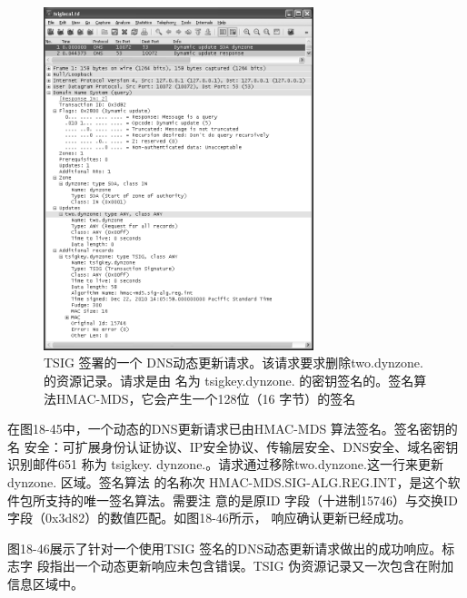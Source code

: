 \begin{figure}[!htb]
    \centering
	\includegraphics[width=0.7\textwidth]{imgs/18/18-45.png}
	\caption{TSIG 签署的一个 DNS动态更新请求。该请求要求删除two.dynzone.的资源记录。请求是由
            名为 tsigkey.dynzone. 的密钥签名的。签名算法HMAC-MDS，它会产生一个128位（16
            字节）的签名}
\end{figure}

在图18-45中，一个动态的DNS更新请求已由HMAC-MDS 算法签名。签名密钥的名
安全：可扩展身份认证协议、IP安全协议、传输层安全、DNS安全、域名密钥识别邮件651
称为 tsigkey. dynzone.。请求通过移除two.dynzone.这一行来更新 dynzone. 区域。签名算法
的名称次 HMAC-MDS.SIG-ALG.REG.INT，是这个软件包所支持的唯一签名算法。需要注
意的是原ID 字段（十进制15746）与交换ID 字段（0x3d82）的数值匹配。如图18-46所示，
响应确认更新已经成功。

图18-46展示了针对一个使用TSIG 签名的DNS动态更新请求做出的成功响应。标志字
段指出一个动态更新响应未包含错误。TSIG 伪资源记录又一次包含在附加信息区域中。

